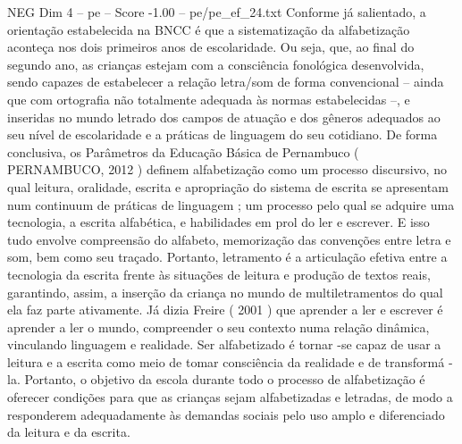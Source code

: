 \begin{textsample}{NEG Dim 4 – pe – Score -1.00 – pe/pe\_ef\_24.txt}
Conforme já salientado, a orientação estabelecida na BNCC é que a sistematização da alfabetização aconteça nos dois primeiros anos de escolaridade.
Ou seja, que, ao final do segundo ano, as crianças estejam com a consciência fonológica desenvolvida, sendo capazes de estabelecer a relação letra/som de forma convencional – ainda que com ortografia não totalmente adequada às normas estabelecidas –, e inseridas no mundo letrado dos campos de atuação e dos gêneros adequados ao seu nível de escolaridade e a práticas de linguagem do seu cotidiano.
De forma conclusiva, os Parâmetros da Educação Básica de Pernambuco ( PERNAMBUCO, 2012 ) definem alfabetização como um processo discursivo, no qual leitura, oralidade, escrita e apropriação do sistema de escrita se apresentam num continuum de práticas de linguagem ; um processo pelo qual se adquire uma tecnologia, a escrita alfabética, e habilidades em prol do ler e escrever.
E isso tudo envolve compreensão do alfabeto, memorização das convenções entre letra e som, bem como seu traçado.
Portanto, letramento é a articulação efetiva entre a tecnologia da escrita frente às situações de leitura e produção de textos reais, garantindo, assim, a inserção da criança no mundo de multiletramentos do qual ela faz parte ativamente.
Já dizia Freire ( 2001 ) que aprender a ler e escrever é aprender a ler o mundo, compreender o seu contexto numa relação dinâmica, vinculando linguagem e realidade.
Ser alfabetizado é tornar -se capaz de usar a leitura e a escrita como meio de tomar consciência da realidade e de transformá -la.
Portanto, o objetivo da escola durante todo o processo de alfabetização é oferecer condições para que as crianças sejam alfabetizadas e letradas, de modo a responderem adequadamente às demandas sociais pelo uso amplo e diferenciado da leitura e da escrita.

\end{textsample}
